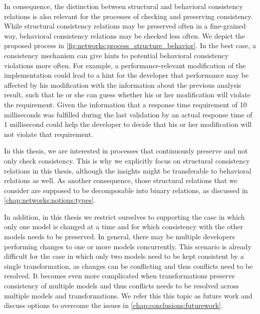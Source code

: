In consequence, the distinction between structural and behavioral consistency relations is also relevant for the processes of checking and preserving consistency.
While structural consistency relations may be preserved often in a fine-grained way, behavioral consistency relations may be checked less often.
We depict the proposed process in \autoref{fig:networks:process_structure_behavior}.
In the best case, a consistency mechanism can give hints to potential behavioral consistency violations more often.
For example, a performance-relevant modification of the implementation could lead to a hint for the developer that performance may be affected by his modification with the information about the previous analysis result, such that he or she can guess whether his or her modification will violate the requirement.
Given the information that a response time requirement of 10 milliseconds was fulfilled during the last validation by an actual response time of 1 millisecond could help the developer to decide that his or her modification will not violate that requirement.

In this thesis, we are interested in processes that continuously preserve and not only check consistency.
This is why we explicitly focus on structural consistency relations in this thesis, although the insights might be transferable to behavioral relations as well.
As another consequence, those structural relations that we consider are supposed to be decomposable into binary relations, as discussed in \autoref{chap:networks:notions:types}.

In addition, in this thesis we restrict ourselves to supporting the case in which only one model is changed at a time and for which consistency with the other models needs to be preserved.
In general, there may be multiple developers performing changes to one or more models concurrently.
This scenario is already difficult for the case in which only two models need to be kept consistent by a single transformation, as changes can be conflicting and thus conflicts need to be resolved.
It becomes even more complicated when transformations preserve consistency of multiple models and thus conflicts needs to be resolved across multiple models and transformations.
We refer this this topic as future work and discuss options to overcome the issues in \autoref{chap:conclusions:futurework}.


